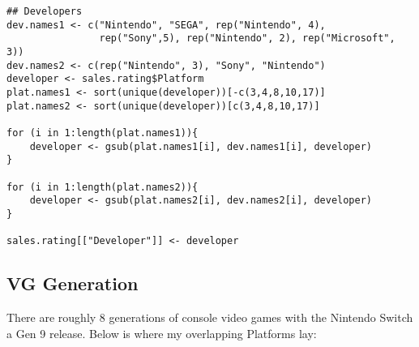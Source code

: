 \begin{verbatim}
## Developers
dev.names1 <- c("Nintendo", "SEGA", rep("Nintendo", 4),
                rep("Sony",5), rep("Nintendo", 2), rep("Microsoft", 3))
dev.names2 <- c(rep("Nintendo", 3), "Sony", "Nintendo")
developer <- sales.rating$Platform 
plat.names1 <- sort(unique(developer))[-c(3,4,8,10,17)]
plat.names2 <- sort(unique(developer))[c(3,4,8,10,17)]

for (i in 1:length(plat.names1)){
    developer <- gsub(plat.names1[i], dev.names1[i], developer)
}

for (i in 1:length(plat.names2)){
    developer <- gsub(plat.names2[i], dev.names2[i], developer)
}

sales.rating[["Developer"]] <- developer
\end{verbatim}

\subsection{VG Generation}
There are roughly 8 generations of console video games with the Nintendo Switch a Gen 9 release. Below is where my overlapping Platforms lay:

